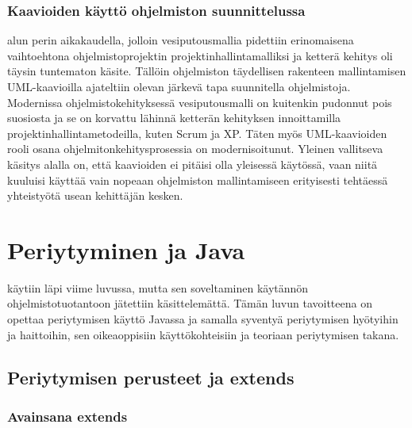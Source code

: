 \documentclass{tufte-book}
\begin{document}
\subsection{Kaavioiden käyttö ohjelmiston suunnittelussa}
\label{UMLkäyttö}

 alun perin aikakaudella, jolloin vesiputousmallia pidettiin
erinomaisena vaihtoehtona ohjelmistoprojektin projektinhallintamalliksi ja ketterä kehitys oli
täysin tuntematon käsite. Tällöin ohjelmiston täydellisen rakenteen mallintamisen UML-kaavioilla 
ajateltiin olevan järkevä tapa suunnitella ohjelmistoja. Modernissa ohjelmistokehityksessä
vesiputousmalli on kuitenkin pudonnut pois suosiosta ja se on korvattu lähinnä ketterän kehityksen
innoittamilla projektinhallintametodeilla, kuten Scrum ja XP. Täten myös UML-kaavioiden rooli
osana ohjelmitonkehitysprosessia on modernisoitunut. Yleinen vallitseva käsitys alalla on, että
kaavioiden ei pitäisi olla yleisessä käytössä, vaan niitä kuuluisi käyttää vain nopeaan
ohjelmiston mallintamiseen erityisesti tehtäessä yhteistyötä usean kehittäjän kesken.


\chapter{Periytyminen ja Java}
\label{periytyminen2}

 käytiin läpi viime luvussa, mutta sen soveltaminen
käytännön ohjelmistotuotantoon jätettiin käsittelemättä. Tämän luvun tavoitteena on opettaa
periytymisen käyttö Javassa ja samalla syventyä periytymisen hyötyihin ja haittoihin, sen
oikeaoppisiin käyttökohteisiin ja teoriaan periytymisen takana.


\section{Periytymisen perusteet ja extends}
\label{periytyminen3}

\subsection{Avainsana extends}
\label{extends}
\end{document}
